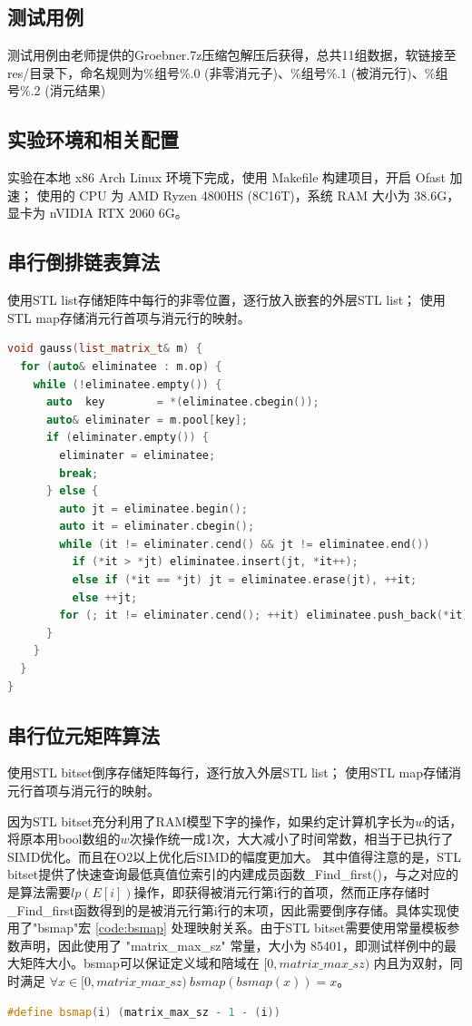 \documentclass[a4paper]{article}
\begin{document}
\subsection{测试用例}
测试用例由老师提供的Groebner.7z压缩包解压后获得，总共11组数据，软链接至res/目录下，命名规则为\%组号\%.0 (非零消元子)、\%组号\%.1 (被消元行)、\%组号\%.2 (消元结果)

\subsection{实验环境和相关配置}
实验在本地 x86 Arch Linux 环境下完成，使用 Makefile 构建项目，开启 Ofast 加速；
使用的 CPU 为 AMD Ryzen 4800HS (8C16T)，系统 RAM 大小为 38.6G，显卡为 nVIDIA RTX 2060 6G。

\subsection{串行倒排链表算法}
使用STL list存储矩阵中每行的非零位置，逐行放入嵌套的外层STL list；
使用STL map存储消元行首项与消元行的映射。

\begin{lstlisting}[frame=trbl, language={C++}, caption={串行倒排链表消元部分}]
void gauss(list_matrix_t& m) {
  for (auto& eliminatee : m.op) {
    while (!eliminatee.empty()) {
      auto  key        = *(eliminatee.cbegin());
      auto& eliminater = m.pool[key];
      if (eliminater.empty()) {
        eliminater = eliminatee;
        break;
      } else {
        auto jt = eliminatee.begin();
        auto it = eliminater.cbegin();
        while (it != eliminater.cend() && jt != eliminatee.end())
          if (*it > *jt) eliminatee.insert(jt, *it++);
          else if (*it == *jt) jt = eliminatee.erase(jt), ++it;
          else ++jt;
        for (; it != eliminater.cend(); ++it) eliminatee.push_back(*it);
      }
    }
  }
}
\end{lstlisting}

\subsection{串行位元矩阵算法}
使用STL bitset倒序存储矩阵每行，逐行放入外层STL list；
使用STL map存储消元行首项与消元行的映射。

因为STL bitset充分利用了RAM模型下字的操作，如果约定计算机字长为$w$的话，将原本用bool数组的$w$次操作统一成1次，大大减小了时间常数，相当于已执行了SIMD优化。而且在O2以上优化后SIMD的幅度更加大。
其中值得注意的是，STL bitset提供了快速查询最低真值位索引的内建成员函数\_Find\_first()，与之对应的是算法需要$lp(E[i])$操作，即获得被消元行第i行的首项，然而正序存储时\_Find\_first函数得到的是被消元行第i行的末项，因此需要倒序存储。具体实现使用了"bsmap"宏 \ref{code:bsmap} 处理映射关系。由于STL bitset需要使用常量模板参数声明，因此使用了 "matrix\_max\_sz" 常量，大小为 85401，即测试样例中的最大矩阵大小。bsmap可以保证定义域和陪域在 $[0, matrix\_max\_sz)$ 内且为双射，同时满足 $\forall{x \in [0, matrix\_max\_sz)}\ bsmap(bsmap(x)) = x$。
\begin{lstlisting}[frame=trbl, language={C++}, caption={bsmap 宏}, label = {code:bsmap}]
#define bsmap(i) (matrix_max_sz - 1 - (i))
\end{lstlisting}
\end{document}
